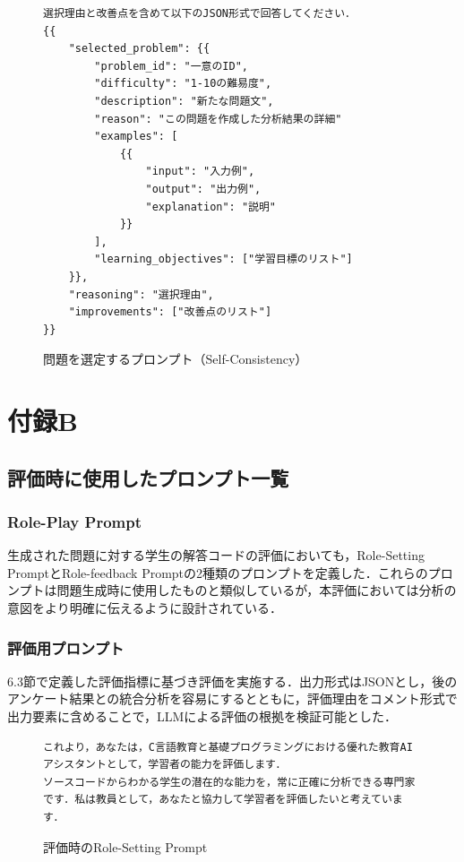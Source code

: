 \documentclass[11pt]{jreport}
\begin{document}
\begin{appendices}
\begin{figure}[!hbt]
\begin{mdframed}[linewidth=1pt]
\begin{lstlisting}
選択理由と改善点を含めて以下のJSON形式で回答してください．
{{
    "selected_problem": {{
        "problem_id": "一意のID",
        "difficulty": "1-10の難易度",
        "description": "新たな問題文",
        "reason": "この問題を作成した分析結果の詳細"
        "examples": [
            {{
                "input": "入力例",
                "output": "出力例",
                "explanation": "説明"
            }}
        ],
        "learning_objectives": ["学習目標のリスト"]
    }},
    "reasoning": "選択理由",
    "improvements": ["改善点のリスト"]
}}
\end{lstlisting}
\end{mdframed}
\caption{問題を選定するプロンプト（Self-Consistency）}
    \label{fig:self-consistency}
\end{figure}

\chapter*{付録B}  %
\setcounter{figure}{0}
\section{評価時に使用したプロンプト一覧}
\subsection{Role-Play Prompt}
生成された問題に対する学生の解答コードの評価においても，Role-Setting PromptとRole-feedback Promptの2種類のプロンプトを定義した．これらのプロンプトは問題生成時に使用したものと類似しているが，本評価においては分析の意図をより明確に伝えるように設計されている．
\subsection{評価用プロンプト}
6.3節で定義した評価指標に基づき評価を実施する．出力形式はJSONとし，後のアンケート結果との統合分析を容易にするとともに，評価理由をコメント形式で出力要素に含めることで，LLMによる評価の根拠を検証可能とした．
\begin{figure}[!hbt]
\begin{mdframed}[linewidth=1pt]
\begin{lstlisting}
これより，あなたは，C言語教育と基礎プログラミングにおける優れた教育AIアシスタントとして，学習者の能力を評価します．
ソースコードからわかる学生の潜在的な能力を，常に正確に分析できる専門家です．私は教員として，あなたと協力して学習者を評価したいと考えています．
\end{lstlisting}
\end{mdframed}
\caption{評価時のRole-Setting Prompt}
    \label{fig:role-setting-prompt-analyze}
\end{figure}


\end{appendices}
\end{document}
